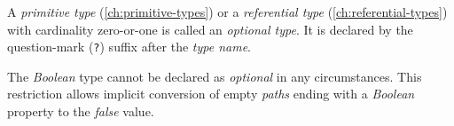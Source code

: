 A \emph{primitive type} (\ref{ch:primitive-types})
or a \emph{referential type} (\ref{ch:referential-types})
with cardinality zero-or-one is called an \emph{optional type}.
It is declared by the question-mark (\verb|?|) suffix
after the \emph{type name}.

The \emph{Boolean} type cannot be declared as \emph{optional} in any circumstances.
This restriction allows implicit conversion of empty \emph{paths}
ending with a \emph{Boolean} property to the \emph{false} value.

